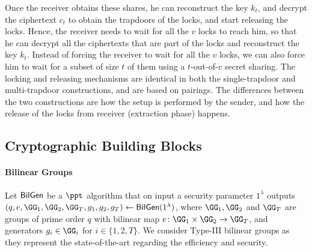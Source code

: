 Once the receiver obtains these shares, he can reconstruct the key $k_t$, and decrypt the ciphertext $c_t$ 
to obtain the trapdoors of the locks, and start releasing the locks. Hence, the receiver needs to wait for 
all the $v$ locks to reach him, so that he can decrypt all the ciphertexts that are part of the locks and 
reconstruct the key $k_t$. Instead of forcing the receiver to wait for all the $v$ locks, we can also force 
him to wait for a subset of size $t$ of them using a $t$-out-of-$v$ secret sharing. The locking and releasing 
mechanisms are identical in both the single-trapdoor and multi-trapdoor constructions, and are based on pairings. 
The differences between the two constructions are how the setup is performed by the sender, and how the release 
of the locks from receiver (extraction phase) happens.

\subsection{Cryptographic Building Blocks}

\paragraph{Bilinear Groups} Let $\mathsf{BilGen}$ be a $\ppt$ algorithm that on input a security parameter 
$1^\lambda$ outputs $(q, e, \GG_1, \GG_2, \GG_T, g_1, g_2, g_T) \gets \BilGen(1^\lambda)$, where 
$\GG_1, \GG_2$ and $\GG_T$ are groups of prime order $q$ with bilinear map $e \colon \GG_1 \times 
\GG_2 \to \GG_T$, and generators $g_i \in \GG_i$ for $i \in \{1,2,T\}$. We consider Type-III bilinear 
groups as they represent the state-of-the-art regarding the efficiency and security.

